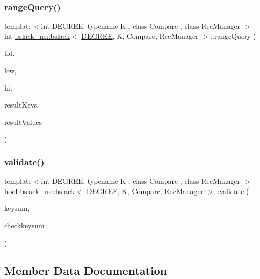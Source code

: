 \subsubsection{\texorpdfstring{range\+Query()}{rangeQuery()}}
{\footnotesize\ttfamily template$<$int D\+E\+G\+R\+EE, typename K , class Compare , class Rec\+Manager $>$ \\
int \hyperlink{classbslack__ns_1_1bslack}{bslack\+\_\+ns\+::bslack}$<$ \hyperlink{brown__sigouin__abtree__kcas_2adapter_8h_a5d88b17d70c985f2f2b8e987037fd6dd}{D\+E\+G\+R\+EE}, K, Compare, Rec\+Manager $>$\+::range\+Query (\begin{DoxyParamCaption}\item[{const int}]{tid,  }\item[{const K \&}]{low,  }\item[{const K \&}]{hi,  }\item[{K $\ast$const}]{result\+Keys,  }\item[{void $\ast$$\ast$const}]{result\+Values }\end{DoxyParamCaption})}

\mbox{\label{classbslack__ns_1_1bslack_aceebd2c190f7a6db8ef279ccc205dc30}} 
\subsubsection{\texorpdfstring{validate()}{validate()}}
{\footnotesize\ttfamily template$<$int D\+E\+G\+R\+EE, typename K , class Compare , class Rec\+Manager $>$ \\
bool \hyperlink{classbslack__ns_1_1bslack}{bslack\+\_\+ns\+::bslack}$<$ \hyperlink{brown__sigouin__abtree__kcas_2adapter_8h_a5d88b17d70c985f2f2b8e987037fd6dd}{D\+E\+G\+R\+EE}, K, Compare, Rec\+Manager $>$\+::validate (\begin{DoxyParamCaption}\item[{const long long}]{keysum,  }\item[{const bool}]{checkkeysum }\end{DoxyParamCaption})\hspace{0.3cm}{\ttfamily [inline]}}



\subsection{Member Data Documentation}
\mbox{\label{classbslack__ns_1_1bslack_a224a18105742df2b9e9d3c71a9dfed10}} 
